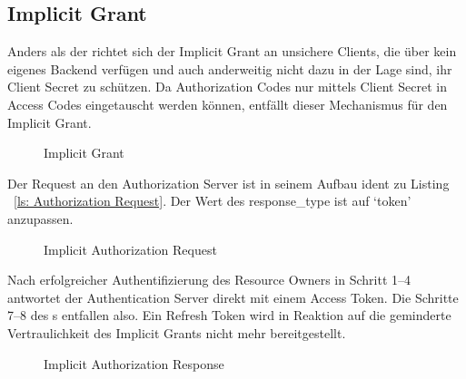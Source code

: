 \subsection{Implicit Grant}\label{ssec:implicit}
Anders als der  richtet sich der Implicit Grant an
unsichere Clients, die über kein eigenes Backend verfügen und auch anderweitig
nicht dazu in der Lage sind, ihr Client Secret zu schützen. Da Authorization
Codes nur mittels Client Secret in Access Codes eingetauscht werden können,
entfällt dieser Mechanismus für den Implicit Grant.

\begin{figure}[h]
    \scalebox{.6} {
        
    }
    \caption{Implicit Grant}\label{fig: Implicit Grant}
\end{figure} \noindent
Der Request an den Authorization Server ist in seinem Aufbau ident zu Listing
~\ref{ls: Authorization Request}. Der Wert des response\_type ist auf `token'
anzupassen.

\begin{figure}[h]
    \scalebox{.8}{
        
    }
    \caption{Implicit Authorization Request}\label{ls: Implicit Authorization Request}
\end{figure} \noindent
Nach erfolgreicher Authentifizierung des Resource Owners in Schritt 1--4
antwortet der Authentication Server direkt mit einem Access Token. Die Schritte
7--8 des s entfallen also. Ein Refresh
Token wird in Reaktion auf die geminderte Vertraulichkeit des Implicit Grants
nicht mehr bereitgestellt.

\begin{figure}[h]
    \scalebox{.8}{
        
    }
    \caption{Implicit Authorization Response}\label{ls: Implicit Authorization Response}
\end{figure} \noindent
